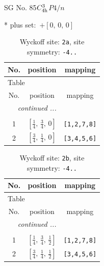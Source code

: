 \documentclass[fleqn,8pt]{jsarticle}
\begin{document}
\setcounter{MaxMatrixCols}{32}

\renewcommand{\tablename}{Table~}
\renewcommand{\figurename}{Figure~}
\begin{center}
\LARGE
SG No. 85\quad$C_{\rm 4h}^{3}$\quad$P4/n$\quad[ tetragonal ]
\end{center}
* plus set:\,\,\,$+\left[ 0,\, 0,\, 0 \right]$
\renewcommand{\arraystretch}{1.2}
\begin{longtable}{ccc}
\caption{Wyckoff site: {\tt 2a}, site symmetry: {\tt -4..}}
 \\
 \hline \hline
No. & position & mapping \\ \hline \endfirsthead

\multicolumn{2}{l}{\tablename\ \thetable{}} \\
 \hline \hline
No. & position & mapping \\ \hline \endhead

 \hline \hline
\multicolumn{2}{r}{\footnotesize\it continued ...} \\ \endfoot

 \hline \hline
\multicolumn{2}{r}{} \\ \endlastfoot

1 & $\left[ \frac{1}{4},\, \frac{3}{4},\, 0 \right]$ & {\tt [1,2,7,8]} \\ \hline
2 & $\left[ \frac{3}{4},\, \frac{1}{4},\, 0 \right]$ & {\tt [3,4,5,6]} \\
\end{longtable}
\renewcommand{\arraystretch}{1.2}
\begin{longtable}{ccc}
\caption{Wyckoff site: {\tt 2b}, site symmetry: {\tt -4..}}
 \\
 \hline \hline
No. & position & mapping \\ \hline \endfirsthead

\multicolumn{2}{l}{\tablename\ \thetable{}} \\
 \hline \hline
No. & position & mapping \\ \hline \endhead

 \hline \hline
\multicolumn{2}{r}{\footnotesize\it continued ...} \\ \endfoot

 \hline \hline
\multicolumn{2}{r}{} \\ \endlastfoot

1 & $\left[ \frac{1}{4},\, \frac{3}{4},\, \frac{1}{2} \right]$ & {\tt [1,2,7,8]} \\ \hline
2 & $\left[ \frac{3}{4},\, \frac{1}{4},\, \frac{1}{2} \right]$ & {\tt [3,4,5,6]} \\
\end{longtable}
\end{document}
